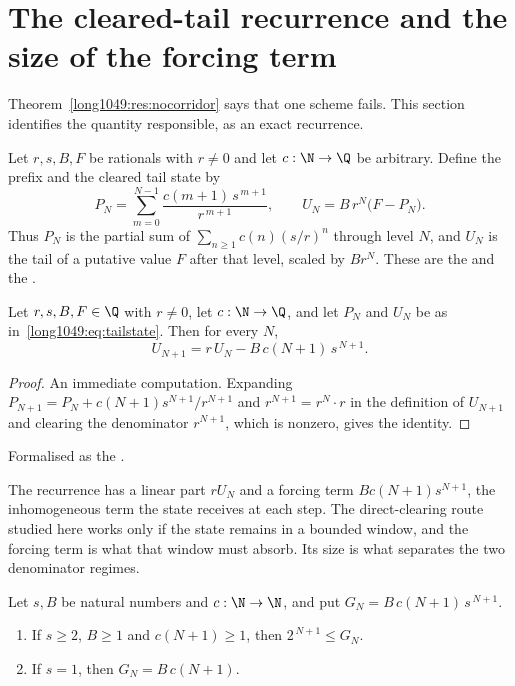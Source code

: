 \documentclass[11pt]{article}
\begin{document}
\section{The cleared-tail recurrence and the size of the forcing
term}\label{long1049:sec:tail}

Theorem~\ref{long1049:res:nocorridor} says that one scheme fails.  This section
identifies the quantity responsible, as an exact recurrence.

Let $r,s,B,F$ be rationals with $r\ne0$ and let $c:\N\to\Q$ be arbitrary.
Define the prefix and the cleared tail state by
\[
 P_N=\sum_{m=0}^{N-1}\frac{c(m+1)\,s^{\,m+1}}{r^{\,m+1}},
 \qquad
 U_N=B\,r^{N}\bigl(F-P_N\bigr).
\tag{$\ast$}\label{long1049:eq:tailstate}
\]
Thus $P_N$ is the partial sum of $\sum_{n\ge1}c(n)(s/r)^{n}$ through level $N$,
and $U_N$ is the tail of a putative value $F$ after that level, scaled by
$Br^{N}$.  These are the
 and the
.

\begin{theorem}\label{long1049:res:tailrec}
Let $r,s,B,F\in\Q$ with $r\ne0$, let $c:\N\to\Q$, and let $P_N$ and $U_N$ be as
in~\eqref{long1049:eq:tailstate}.  Then for every $N$,
\[
 U_{N+1}=r\,U_N-B\,c(N+1)\,s^{\,N+1}.
\]
\end{theorem}

\begin{proof}
An immediate computation.  Expanding
$P_{N+1}=P_N+c(N+1)s^{N+1}/r^{N+1}$ and $r^{N+1}=r^{N}\cdot r$ in the
definition of $U_{N+1}$ and clearing the denominator $r^{N+1}$, which is
nonzero, gives the identity.
\end{proof}

\noindent Formalised as the
.

The recurrence has a linear part $rU_N$ and a forcing term $Bc(N+1)s^{N+1}$,
the inhomogeneous term the state receives at each step.
The direct-clearing route studied here works only if the state remains in a
bounded window, and the forcing term is what that window must absorb.  Its
size is what separates the two denominator regimes.

\begin{theorem}\label{long1049:res:forcing}
Let $s,B$ be natural numbers and $c:\N\to\N$, and put
$G_N=B\,c(N+1)\,s^{\,N+1}$.
\begin{enumerate}
\item If $s\ge2$, $B\ge1$ and $c(N+1)\ge1$, then $2^{\,N+1}\le G_N$.
\item If $s=1$, then $G_N=B\,c(N+1)$.
\end{enumerate}
\end{theorem}
\end{document}
